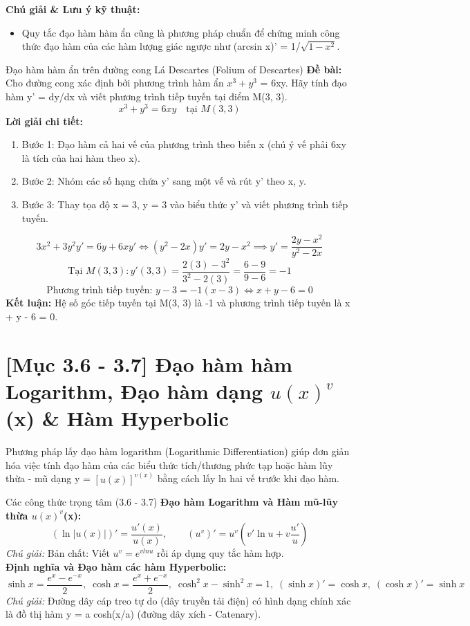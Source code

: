 \documentclass[11pt,a4paper,oneside]{book}
\begin{document}
\noindent\textbf{Chú giải \& Lưu ý kỹ thuật:}
\begin{itemize}[leftmargin=1.5em, itemsep=2pt]
  \item Quy tắc đạo hàm hàm ẩn cũng là phương pháp chuẩn để chứng minh công thức đạo hàm của các hàm lượng giác ngược như (arcsin x)' = 1/$\sqrt{1 - x^2}$.
\end{itemize}

\begin{vidu}{Đạo hàm hàm ẩn trên đường cong Lá Descartes (Folium of Descartes)}
\textbf{Đề bài:} Cho đường cong xác định bởi phương trình hàm ẩn $x^3 + y^3$ = 6xy. Hãy tính đạo hàm y' = dy/dx và viết phương trình tiếp tuyến tại điểm M(3, 3).
\[ x^3 + y^3 = 6xy \quad \text{tại } M(3, 3) \]
\textbf{Lời giải chi tiết:}
\begin{enumerate}[leftmargin=1.5em, itemsep=2pt]
  \item Bước 1: Đạo hàm cả hai vế của phương trình theo biến x (chú ý vế phải 6xy là tích của hai hàm theo x).
  \item Bước 2: Nhóm các số hạng chứa y' sang một vế và rút y' theo x, y.
  \item Bước 3: Thay tọa độ x = 3, y = 3 vào biểu thức y' và viết phương trình tiếp tuyến.
\end{enumerate}
\[ 3x^2 + 3y^2 y' = 6y + 6x y' \iff (y^2 - 2x)y' = 2y - x^2 \implies y' = \frac{2y - x^2}{y^2 - 2x} \]
\[ \text{Tại } M(3, 3): y'(3, 3) = \frac{2(3) - 3^2}{3^2 - 2(3)} = \frac{6 - 9}{9 - 6} = -1 \]
\[ \text{Phương trình tiếp tuyến: } y - 3 = -1(x - 3) \iff x + y - 6 = 0 \]
\noindent\textbf{Kết luận:} Hệ số góc tiếp tuyến tại M(3, 3) là -1 và phương trình tiếp tuyến là x + y - 6 = 0.
\end{vidu}

\section{[Mục 3.6 - 3.7] Đạo hàm hàm Logarithm, Đạo hàm dạng $u(x)^v$(x) \& Hàm Hyperbolic}
Phương pháp lấy đạo hàm logarithm (Logarithmic Differentiation) giúp đơn giản hóa việc tính đạo hàm của các biểu thức tích/thương phức tạp hoặc hàm lũy thừa - mũ dạng y = $[u(x)]^{v(x)}$ bằng cách lấy ln hai vế trước khi đạo hàm.

\begin{congthuc}{Các công thức trọng tâm (3.6 - 3.7)}
\noindent\textbf{Đạo hàm Logarithm và Hàm mũ-lũy thừa $u(x)^v$(x):}
\[ (\ln|u(x)|)' = \frac{u'(x)}{u(x)}, \qquad \left(u^v\right)' = u^v \left(v' \ln u + v \frac{u'}{u}\right) \]
\noindent\textit{Chú giải:} Bản chất: Viết $u^v = e^{v ln u}$ rồi áp dụng quy tắc hàm hợp.\\[4pt]
\noindent\textbf{Định nghĩa và Đạo hàm các hàm Hyperbolic:}
\[ \sinh x = \frac{e^x - e^{-x}}{2}, \; \cosh x = \frac{e^x + e^{-x}}{2}, \; \cosh^2 x - \sinh^2 x = 1, \; (\sinh x)' = \cosh x, \; (\cosh x)' = \sinh x \]
\noindent\textit{Chú giải:} Đường dây cáp treo tự do (dây truyền tải điện) có hình dạng chính xác là đồ thị hàm y = a cosh(x/a) (đường dây xích - Catenary).\\[4pt]
\end{congthuc}
\end{document}

